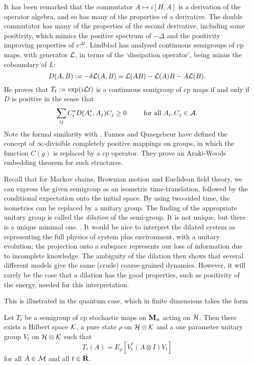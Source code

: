 It has been remarked that the commutator $A\mapsto i[H,A]$ is a derivation
of the operator algebra, and so has many of the properties of a derivative.
The double commutator
has many of the properties of the second derivative, including some
positivity, which mimics the positive spectrum of $-\Delta$ and the
positivity improving properties of $e^{\Delta t}$.
Lindblad has analysed continuous semigroups of cp maps, with generator ${\cal
L}$, in terms of the `dissipation operator', being minus the coboundary of
$L$:
\begin{equation}
D(A,B):=-\delta{\cal L}(A,B)={\cal L}(AB)-{\cal L}(A)B-A{\cal L}(B).
\end{equation}
He proves that $T_t:=\exp(i{\cal L}t)$ is a continuous semigroup of cp maps
if and only if $D$ is positive in the sense that
\begin{equation}
\sum_{ij}C_i^*D(A_i^*,A_j)C_j\geq0\hspace{.3in}\mbox{ for all }A_i, C_j\in
{\cal A}.
\end{equation}
Note the formal similarity with \cite{Araki,RFS2,RFS4,Partha}. Fannes and
Quaegebeur \cite{Fannes} have defined the concept of $\infty$-divisible
completely positive mappings on groups, in which the function $C(g)$ is
replaced by a cp operator. They prove an Araki-Woods embedding theorem
for such structures.


Recall that for Markov chains, Brownian motion and Euclidean field theory,
we can express the given semigroup as an isometric time-translation,
followed by the conditional expectation onto the initial space.
By using two-sided time, the isometries can be replaced by a unitary group.
The finding of the appropriate unitary group is called the {\em dilation}
of the semi-group. It is not unique, but there is a unique minimal one.
\cite{Stinespring}. It would be nice to interpret the dilated system
as representing the full physics of system plus environment, with a
unitary evolution; the projection onto a subspace represents our loss
of information due to incomplete knowledge. The ambiguity of the dilation
then shows that several different models give the same (crude)
coarse-grained dynamics. However, it will rarely be the case that a dilation
has the good properties, such as positivity of the energy, needed for
this interpretation.

This is illustrated in the quantum case, which in finite dimensions
takes the form \cite{Davies}
\begin{theorem}
Let $T_t$ be a semigroup of cp stochastic maps on ${\bf M}_n$ acting
on ${\cal H}$. Then there exists a Hilbert space ${\cal K}$, a pure state
$\rho$ on ${\cal H}\otimes{\cal K}$ and a one parameter unitary group
$V_t$ on ${\cal H}\otimes{\cal K}$ such that
\[ T_t(A)=E_\rho[V^*_t(A\otimes I)V_t]\]
for all $A\in{\cal M}$ and all $t\in{\bf R}$.
\end{theorem}

